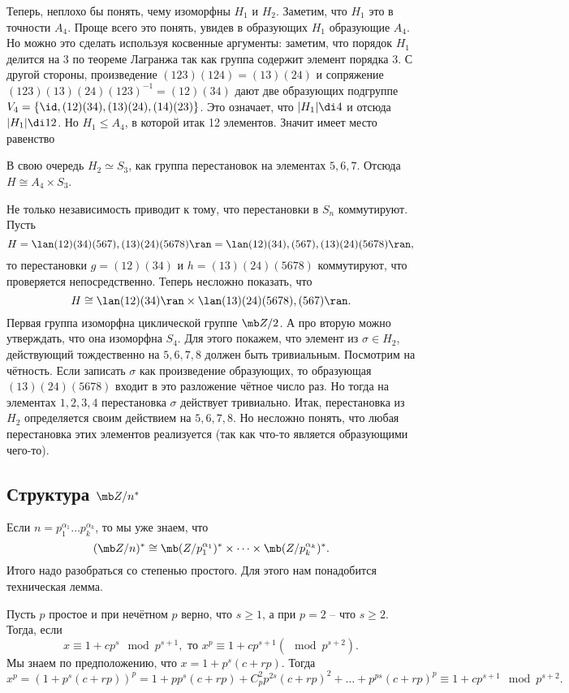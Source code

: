 Теперь, неплохо бы понять, чему изоморфны $H_1$ и $H_2$. Заметим, что $H_1$ это в точности $A_4$. Проще всего это понять, увидев в образующих $H_1$ образующие $A_4$. Но можно это сделать используя косвенные аргументы: заметим, что порядок $H_1$ делится на $3$ по теореме Лагранжа так как группа содержит элемент порядка $3$. С другой стороны, произведение $(123)(124)=(13)(24)$ и сопряжение $(123) (13)(24)(123)^{-1}=(12)(34)$ дают две образующих подгруппе $V_4=\{\id, (12)(34), (13)(24), (14)(23)\}$.  Это означает, что $|H_1|\di 4$ и отсюда $|H_1|\di 12$. Но $H_1 \leq A_4$, в которой итак 12 элементов. Значит имеет место равенство

В свою очередь $H_2\simeq S_3$, как группа перестановок на элементах $5,6,7$. Отсюда $H\cong A_4 \times S_3$.
\item Не только независимость приводит к тому, что перестановки в $S_n$ коммутируют. Пусть $$H=\lan (12)(34)(567), (13)(24)(5678)\ran=\lan (12)(34), (567), (13)(24)(5678)\ran ,$$
то перестановки $g=(12)(34)$ и $h=(13)(24)(5678)$ коммутируют, что проверяется непосредственно. Теперь несложно показать, что $$H\cong \lan (12)(34) \ran \times \lan (13)(24)(5678), (567) \ran.$$
Первая группа изоморфна циклической группе $\mb Z/2$. А про  вторую можно утверждать, что она изоморфна $S_4$. Для этого покажем, что элемент из $\sigma \in H_2$, действующий тождественно на $5,6,7,8$ должен быть тривиальным. Посмотрим на чётность. Если записать $\sigma$ как произведение образующих, то образующая $(13)(24)(5678)$ входит в это разложение чётное число раз. Но тогда на элементах $1,2,3,4$ перестановка $\sigma$ действует тривиально. Итак, перестановка из $H_2$ определяется своим действием на $5,6,7,8$. Но несложно понять, что любая перестановка этих элементов реализуется (так как что-то является образующими чего-то).
\eenm



\subsection{Структура $\mb Z/n^*$}

Если $n=p_1^{\alpha_1}\dots p_k^{\alpha_k}$, то мы уже знаем, что 
$$(\mb Z/n)^* \cong \mb (Z/p_1^{\alpha_1})^{*}\times \dots \times \mb (Z/ p_k^{\alpha_k})^{*}.$$
Итого надо разобраться со степенью простого. Для этого нам понадобится техническая лемма.



\lm Пусть $p$ простое и при нечётном $p$ верно, что $s\geq 1$, а при $p=2$ -- что $s\geq 2$. Тогда, если $$x \equiv 1+cp^s \mod p^{s+1}, \text{ то } x^p\equiv 1+cp^{s+1} (\mod p^{s+2}).$$
\elm
\proof Мы знаем по предположению, что $x=1+p^s(c+rp)$. Тогда $$x^p=(1+p^s(c+rp))^p=1+pp^s(c+rp)+C_p^2p^{2s}(c+rp)^2+\dots+p^{ps}(c+rp)^{p}\equiv 1+cp^{s+1} \mod p^{s+2}.$$
\endproof



